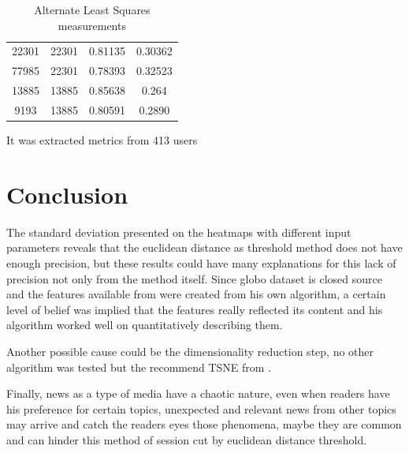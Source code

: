\documentclass[ecp,tc,english]{iiufrgs}
\begin{document}
\begin{table}[!ht]
\begin{tabular}{ |c|c|c|c| }
                \rowcolor[RGB]{220,220,220}                
                22301 & 22301 & 0.81135 & 0.30362 \\
                \rowcolor[RGB]{220,220,220}                
                77985 & 22301 & 0.78393 & 0.32523 \\
                13885 & 13885 & 0.85638 & 0.264 \\
                9193 & 13885 & 0.80591 & 0.2890 \\
                \hline
            \end{tabular}
            \caption{Alternate Least Squares measurements}
            \label{tab:alternate_least_squares_metrics}
        \end{table}
        It was extracted metrics from 413 users


\chapter{Conclusion}
The standard deviation presented on the heatmaps with different input parameters reveals that the euclidean distance as threshold method does not have enough precision, but these results could have many explanations for this lack of precision not only from the method itself. Since globo dataset is closed source and the features available from \cite{deSouzaPereiraMoreira:2018:CDL:3240323.3240331} were created from his own algorithm, a certain level of belief was implied that the features really reflected its content and his algorithm worked well on quantitatively describing them.

Another possible cause could be the dimensionality reduction step, no other algorithm was tested but the recommend TSNE from \cite{deSouzaPereiraMoreira:2018:CDL:3240323.3240331}.

Finally, news as a type of media have a chaotic nature, even when readers have his preference for certain topics, unexpected and relevant news from other topics may arrive and catch the readers eyes those phenomena, maybe they are common and can hinder this method of session cut by euclidean distance threshold. 



\end{document}
